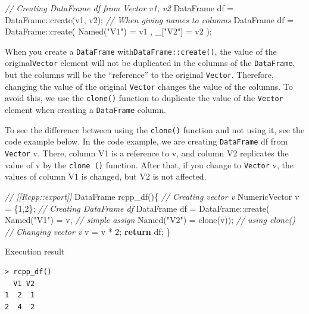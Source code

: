 \documentclass[
]{book}
\newenvironment{Shaded}{\begin{snugshade}}{\end{snugshade}}
\newcommand{\CommentTok}[1]{\textcolor[rgb]{0.56,0.35,0.01}{\textit{#1}}}
\newcommand{\ControlFlowTok}[1]{\textcolor[rgb]{0.13,0.29,0.53}{\textbf{#1}}}
\newcommand{\DecValTok}[1]{\textcolor[rgb]{0.00,0.00,0.81}{#1}}
\newcommand{\NormalTok}[1]{#1}
\newcommand{\StringTok}[1]{\textcolor[rgb]{0.31,0.60,0.02}{#1}}
\begin{document}
\begin{Shaded}
\begin{Highlighting}[]
\CommentTok{// Creating DataFrame df from Vector v1, v2}
\NormalTok{DataFrame df = DataFrame::create(v1, v2);}
\CommentTok{// When giving names to columns}
\NormalTok{DataFrame df = DataFrame::create( Named(}\StringTok{"V1"}\NormalTok{) = v1 , _[}\StringTok{"V2"}\NormalTok{] = v2 );}
\end{Highlighting}
\end{Shaded}

When you create a \texttt{DataFrame} with\texttt{DataFrame::create()}, the value of the original\texttt{Vector} element will not be duplicated in the columns of the \texttt{DataFrame}, but the columns will be the ``reference'' to the original \texttt{Vector}. Therefore, changing the value of the original \texttt{Vector} changes the value of the columns. To avoid this, we use the \texttt{clone()} function to duplicate the value of the \texttt{Vector} element when creating a \texttt{DataFrame} column.

To see the difference between using the \texttt{clone()} function and not using it, see the code example below. In the code example, we are creating \texttt{DataFrame} df from \texttt{Vector} v. There, column V1 is a reference to v, and column V2 replicates the value of v by the \texttt{clone\ ()} function. After that, if you change to \texttt{Vector} v, the values of column V1 is changed, but V2 is not affected.

\begin{Shaded}
\begin{Highlighting}[]
\CommentTok{// [[Rcpp::export]]}
\NormalTok{DataFrame rcpp_df()\{}
    \CommentTok{// Creating vector v}
\NormalTok{    NumericVector v = \{}\DecValTok{1}\NormalTok{,}\DecValTok{2}\NormalTok{\};}
    \CommentTok{// Creating DataFrame df}
\NormalTok{    DataFrame df = DataFrame::create( Named(}\StringTok{"V1"}\NormalTok{) = v,         }\CommentTok{// simple assign}
\NormalTok{                                      Named(}\StringTok{"V2"}\NormalTok{) = clone(v)); }\CommentTok{// using clone()}
    \CommentTok{// Changing vector v}
\NormalTok{    v = v * }\DecValTok{2}\NormalTok{;}
    \ControlFlowTok{return}\NormalTok{ df;}
\NormalTok{\}}
\end{Highlighting}
\end{Shaded}

Execution result

\begin{verbatim}
> rcpp_df()
  V1 V2
1  2  1
2  4  2
\end{verbatim}
\end{document}
